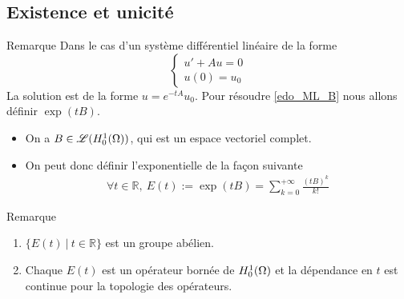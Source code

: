 \subsection{Existence et unicité}

\begin{frame}
    \begin{block}{Remarque}
        Dans le cas d'un système différentiel linéaire de la forme
\begin{equation*}
    \left\{\begin{array}{c}
        u' + Au = 0 \\
        u(0) = u_0
    \end{array}\right.
\end{equation*}
La solution est de la forme $u = e^{-tA} u_0$. 
Pour résoudre \eqref{edo_ML_B} nous allons définir $\exp(tB)$.
    \end{block}
\begin{itemize}
\item On a $B \in \mathscr{L}(H^1_0(\Omega))$, qui est un espace vectoriel complet. 
\item On peut donc définir l'exponentielle de la façon suivante
\begin{eqnarray*}
\forall t \in \mathbb{R},\  E(t) := \exp(tB) = \sum_{k=0}^{+\infty} \frac{(tB)^k}{k!}
\end{eqnarray*} 
\end{itemize}
    \begin{block}{Remarque}
        \begin{enumerate}
        \item[1.] \label{E_groupe_abelien} $\{ E(t) \ | \ t \in \mathbb{R} \}$ est un groupe abélien. 
        \item[2.] Chaque $E(t)$ est un opérateur bornée de $H^1_0(\Omega)$ et la dépendance en $t$ est continue pour la topologie des opérateurs. %

\end{enumerate}
\end{block}
\end{frame}

